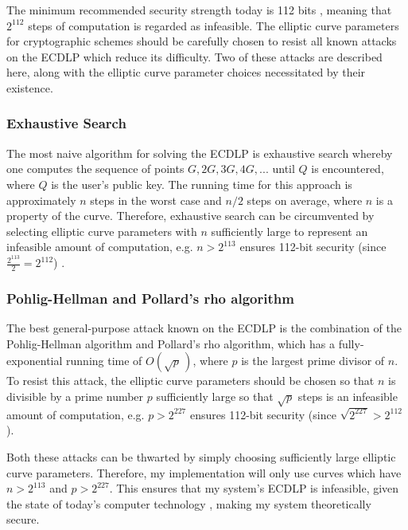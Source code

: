 \documentclass[12pt,a4paper]{article}
\begin{document}
The minimum recommended security strength today is 112 bits \cite{barker2020recommendation}, 
meaning that $2^{112}$ steps of computation is regarded as infeasible. 
The elliptic curve parameters for cryptographic schemes should be carefully chosen to resist all known attacks on the ECDLP which reduce its difficulty. 
Two of these attacks are described here, along with the elliptic curve parameter choices necessitated by their existence. 

\subsubsection{Exhaustive Search} \noindent \label{Exhaustive Search}
The most naive algorithm for solving the ECDLP is exhaustive search whereby one computes the sequence of points 
$G,2G,3G,4G,...$ until $Q$ is encountered, where $Q$ is the user's public key. 
The running time for this approach is approximately $n$ steps in the worst case and $n/2$ steps on average, 
where $n$ is a property of the curve. 
Therefore, exhaustive search can be circumvented by selecting elliptic curve parameters with $n$ sufficiently 
large to represent an infeasible amount of computation, e.g. $n > 2^{113}$ ensures 112-bit security (since $\frac{2^{113}}{2} = 2^{112}$) \cite{hankerson2003guide}. 

\subsubsection{Pohlig-Hellman and Pollard's rho algorithm} \noindent \label{Pohlig-Hellman and Pollard's rho algorithm}
The best general-purpose attack known on the ECDLP is the combination of the Pohlig-Hellman algorithm and Pollard's rho algorithm, 
which has a fully-exponential running time of $O( \sqrt p \,)$, where $p$ is the largest prime divisor of $n$. 
To resist this attack, the elliptic curve parameters should be chosen so that $n$ is divisible by a prime number $p$ sufficiently large 
so that $\sqrt p$ steps is an infeasible amount of computation, e.g. $p > 2^{227}$ ensures 112-bit security (since $\sqrt{2^{227}} > 2^{112}$). 

\vspace{2mm}

Both these attacks can be thwarted by simply choosing sufficiently large elliptic curve parameters. 
Therefore, my implementation will only use curves which have $n > 2^{113}$ and $p > 2^{227}$. 
This ensures that my system's ECDLP is infeasible, given the state of today's computer technology \cite{hankerson2003guide}, 
making my system theoretically secure. 
\end{document}
